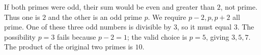 If both primes were odd, their sum would be even and greater than $2$, not prime. Thus one is $2$ and the other is an odd prime $p$. We require $p-2,p,p+2$ all prime. One of these three odd numbers is divisible by $3$, so it must equal $3$. The possibility $p=3$ fails because $p-2=1$; the valid choice is $p=5$, giving $3,5,7$. The product of the original two primes is $\boxed{10}$.
